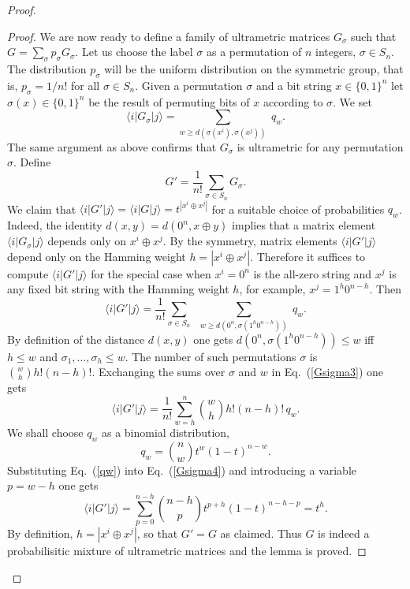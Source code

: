 \begin{proof}
\begin{proof}
We are now ready to define a family of ultrametric matrices $G_\sigma$
such that $G=\sum_\sigma p_\sigma G_\sigma$.
Let us choose the label $\sigma$ as a permutation of $n$ integers, $\sigma \in S_n$.
The distribution $p_\sigma$ will be the uniform distribution on the symmetric group, that is,
$p_\sigma=1/n!$ for all $\sigma\in S_n$.
Given a permutation $\sigma$ and a bit string $x\in \{0,1\}^n$ let $\sigma(x)\in \{0,1\}^n$
be the result of permuting bits of $x$ according to $\sigma$.
We set 
\begin{equation}
\label{Gsigma1}
\langle i|G_\sigma |j\rangle = \sum_{w\ge d(\sigma(x^i),\sigma(x^j))} \;  q_w.
\end{equation}
The same argument as above confirms that $G_\sigma$ is ultrametric for any permutation $\sigma$.
Define 
\begin{equation}
\label{Gsigma2}
G'=\frac1{n!} \sum_{\sigma \in S_n} G_\sigma.
\end{equation}
We claim that  $\langle i|G'|j\rangle = \langle i|G|j\rangle = t^{|x^i\oplus x^j|}$
for a suitable choice of probabilities $q_w$.
Indeed, the identity $d(x,y)=d(0^n,x\oplus y)$ implies that 
a matrix element $\langle i |G_\sigma|j\rangle$ depends only on $x^i\oplus x^j$.
By the symmetry, matrix elements $\langle i| G'|j\rangle$ depend only on the Hamming
weight $h=|x^i\oplus x^j|$. Therefore it suffices to compute
$\langle i |G'|j\rangle$ for the special case when $x^i=0^n$ is the all-zero string
and $x^j$ is any fixed bit string with the Hamming weight $h$, for example,
$x^j=1^h 0^{n-h}$. Then
\begin{equation}
\label{Gsigma3}
\langle i|G'|j\rangle=
\frac1{n!} \sum_{\sigma \in S_n} \; \;  \sum_{w\ge d(0^n,\sigma(1^h0^{n-h}))} \;  q_w.
\end{equation}
By definition of the distance $d(x,y)$ one gets $d(0^n,\sigma(1^h0^{n-h}))\le w$ iff 
$h \le w$ and $\sigma_1,\ldots,\sigma_h\le w$.  The number of such permutations $\sigma$ is ${w \choose h} h! (n-h)!$.
Exchanging the sums over $\sigma$ and $w$ in Eq.~(\ref{Gsigma3})  one gets
\begin{equation}
\label{Gsigma4}
\langle i|G'|j\rangle=
\frac1{n!} \sum_{w=h}^n {w \choose h} h! (n-h)! \,q_w.
\end{equation}
We shall choose $q_w$ as a binomial distribution,
\begin{equation}
\label{qw}
q_w= {n \choose w} t^w (1-t)^{n-w}.
\end{equation}
Substituting Eq.~(\ref{qw}) into Eq.~(\ref{Gsigma4}) 
and introducing a variable $p=w-h$ one gets
\begin{equation}
\label{Gsigma5}
\langle i|G'|j\rangle=
\sum_{p=0}^{n-h}  {n-h \choose p} t^{p+h} (1-t)^{n-h-p}  = t^h.
\end{equation}
By definition, $h=|x^i\oplus x^j|$, so that  $G'=G$ as claimed.
Thus $G$ is indeed a probabilisitic mixture of ultrametric matrices
and the lemma is proved.
\end{proof}
\end{proof}








